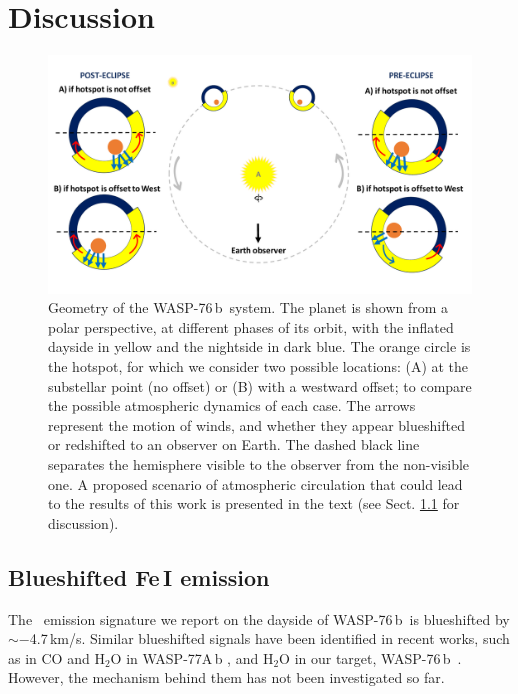 \documentclass{aa}
\newcommand{\feI}{\ion{Fe}{i}}
\newcommand{\planet}{WASP-76\,b}
\begin{document}
\section{Discussion} \label{discussion}


\begin{figure}[h]
    \centering
    \includegraphics[width=0.9\hsize]{plots/system_geometry_final_submission.pdf}
    \caption{Geometry of the \planet\ system. The planet is shown from a polar perspective, at different phases of its orbit, with the inflated dayside in yellow and the nightside in dark blue. The orange circle is the hotspot, for which we consider two possible locations: (A) at the substellar point (no offset) or (B) with a westward offset; to compare the possible atmospheric dynamics of each case. The arrows represent the motion of winds, and whether they appear blueshifted or redshifted to an observer on Earth. The dashed black line separates the hemisphere visible to the observer from the non-visible one. A proposed scenario of atmospheric circulation that could lead to the results of this work is presented in the text (see Sect. \ref{fe_blushift_discussion} for discussion).}
    \label{fig:geometry}
\end{figure}


\subsection{Blueshifted Fe\,I emission}
\label{fe_blushift_discussion}

The \feI\ emission signature we report on the dayside of \planet\ is blueshifted by $\sim-$4.7\,km/s. Similar blueshifted signals have been identified in recent works, such as in CO and H$_2$O in WASP-77A\,b \citep{line2021}, and H$_2$O in our target, \planet\ \citep{yan2023}. However, the mechanism behind them has not been investigated so far. 
\end{document}
